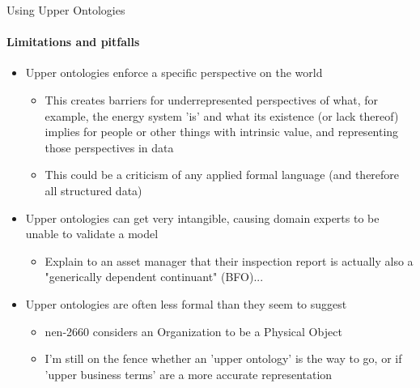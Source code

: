\begin{frame}{Using Upper Ontologies}
    \framesubtitle{Limitations and pitfalls}


    \begin{itemize}
        \item Upper ontologies enforce a specific perspective on the world
        \begin{itemize}
            \item This creates barriers for underrepresented perspectives of what, for example, the energy system 'is' and what its existence (or lack thereof) implies for people or other things with intrinsic value, and representing those perspectives in data
            \item This could be a criticism of any applied formal language (and therefore all structured data)
        \end{itemize}
        \pause
        \item Upper ontologies can get very intangible, causing domain experts to be unable to validate a model
        \begin{itemize}
            \item Explain to an asset manager that their inspection report is actually also a "generically dependent continuant" (BFO)...
        \end{itemize}
        \pause
        \item Upper ontologies are often less formal than they seem to suggest
        \begin{itemize}
            \item nen-2660 considers an Organization to be a Physical Object
            \item I'm still on the fence whether an 'upper ontology' is the way to go, or if 'upper business terms' are a more accurate representation
        \end{itemize}
    \end{itemize}
\end{frame}
